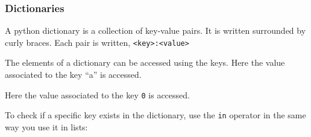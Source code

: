 \subsubsection{Dictionaries}\label{python-introduction.md__dictionaries}

A python dictionary is a collection of key-value pairs. It is written
surrounded by curly braces. Each pair is written,
\texttt{\textless{}key\textgreater{}:\textless{}value\textgreater{}}

\begin{Shaded}
\begin{Highlighting}[]
\OperatorTok{=}\NormalTok{ \{}\NormalTok{:}\NormalTok{,}\NormalTok{:}\NormalTok{,}\NormalTok{:}\NormalTok{\}}
\end{Highlighting}
\end{Shaded}

The elements of a dictionary can be accessed using the keys. Here the
value associated to the key ``a'' is accessed.

\begin{Shaded}
\begin{Highlighting}[]
\NormalTok{d[}\NormalTok{]}
\end{Highlighting}
\end{Shaded}

\begin{Shaded}
\begin{Highlighting}[]
\end{Highlighting}
\end{Shaded}

Here the value associated to the key \texttt{0} is accessed.

\begin{Shaded}
\begin{Highlighting}[]
\NormalTok{d[}\NormalTok{]}
\end{Highlighting}
\end{Shaded}

\begin{Shaded}
\begin{Highlighting}[]
\end{Highlighting}
\end{Shaded}

To check if a specific key exists in the dictionary, use the \texttt{in}
operator in the same way you use it in lists:

